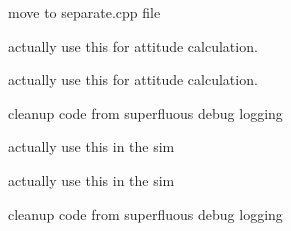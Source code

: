 
\begin{DoxyRefList}
\item[\label{todo__todo000005}%
\hypertarget{todo__todo000005}{}%
Class \hyperlink{classAsync__Server}{Async\+\_\+\+Server} ]move to separate.\+cpp file  
\item[\label{todo__todo000001}%
\hypertarget{todo__todo000001}{}%
Class \hyperlink{classAttitudeSensor}{Attitude\+Sensor} ]actually use this for attitude calculation. 

actually use this for attitude calculation.  
\item[\label{todo__todo000003}%
\hypertarget{todo__todo000003}{}%
Class \hyperlink{classLogLine}{Log\+Line} ]cleanup code from superfluous debug logging  
\item[\label{todo__todo000006}%
\hypertarget{todo__todo000006}{}%
Class \hyperlink{classPositionSensor}{Position\+Sensor} ]actually use this in the sim  
\item[\label{todo__todo000007}%
\hypertarget{todo__todo000007}{}%
Class \hyperlink{classSonar}{Sonar} ]actually use this in the sim  
\item[\label{todo__todo000004}%
\hypertarget{todo__todo000004}{}%
Class \hyperlink{classVrepLog}{Vrep\+Log} ]cleanup code from superfluous debug logging 
\end{DoxyRefList}